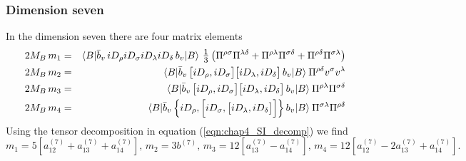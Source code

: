 \subsubsection{Dimension seven}\label{eqn:dim_7_SI_mat_decomp}
\vspace{-0.3cm}
In the dimension seven there are four matrix elements \cite{Mannel:2010wj}
\begin{eqnarray}
2M_B\, m_1 &=& \langle B | \bar b_v \, i D_\rho i D_\sigma i D_\lambda iD_\delta 
\,b_v | B \rangle\,\, \scalebox{1.1}{$\frac{1}{3}$} 
\left(\Pi^{\rho \sigma}\Pi^{\lambda \delta} + 
\Pi^{\rho \lambda}\Pi^{\sigma \delta}+\Pi^{\rho \delta}\Pi^{\sigma \lambda}\right) \nonumber\\
\nonumber
2M_B\, m_2 &=& \langle B | \bar b_v \, \big[ i D_\rho ,  i D_\sigma \big] 
\big[ i D_\lambda ,  i D_\delta\big] \,b_v | B \rangle \:\Pi^{\rho\delta}v^\sigma 
v^\lambda \\
\nonumber
2M_B\, m_3 &=& \langle B | \bar b_v \, \big[i D_\rho ,  i D_\sigma\big]
\big[ iD_\lambda, iD_\delta\big] \,b_v|B\rangle\:\Pi^{\rho \lambda}\Pi^{\sigma \delta} \\
2M_B\, m_4 &=& \langle B | \bar b_v \, \Big\lbrace i D_\rho , \Big[i D_\sigma ,
\big[ i D_\lambda , i D_\delta\big]\Big]\Big \rbrace \,b_v | B \rangle \:
\Pi^{\sigma \lambda}\Pi^{\rho \delta}
\end{eqnarray}
Using the tensor decomposition in equation (\ref{eqn:chap4_SI_decomp}) we find 
\begin{equation}
m_1=5\left[a_{12}^{(7)}+a_{13}^{(7)}+a_{14}^{(7)}\right],\,m_2=3b^{(7)},\, m_3=12\left[a_{13}^{(7)}-a_{14}^{(7)}\right],\,m_4=12\left[a_{12}^{(7)}-2a_{13}^{(7)}+a_{14}^{(7)}\right].
\end{equation}
\vspace{-0.5cm}
